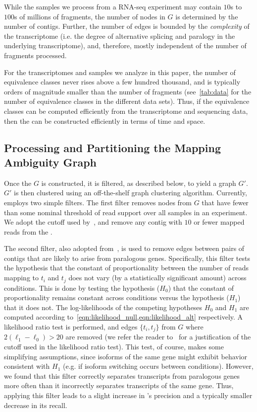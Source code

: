 While the samples we process from a \denovo RNA-seq experiment may contain $10$s to $100$s of millions of fragments, the number of nodes in $G$ is determined by the number of contigs.  Further, the number of edges is bounded by the \textit{complexity} of the transcriptome (i.e. the degree of alternative splicing and paralogy in the underlying transcriptome), and, therefore, mostly independent of the number of fragments processed. 

For the transcriptomes and samples we analyze in this paper, the number of equivalence classes never rises above a few hundred thousand, and is typically orders of magnitude smaller than the number of fragments (see~\cref{tab:data} for the number of equivalence classes in the different data sets).  Thus, if the equivalence classes can be computed efficiently from the transcriptome and sequencing data, then the \ambiggraph can be constructed efficiently in terms of time and space.

\subsection{Processing and Partitioning the Mapping Ambiguity Graph}
\label{sec:mag_filter}

Once the \ambiggraph $G$ is constructed, it is filtered, as described below, to yield a graph $G'$.  $G'$ is then clustered using an off-the-shelf graph clustering algorithm.  Currently, \rapclust employs two simple filters. The first filter removes nodes from $G$ that have fewer than some nominal threshold of read support over all samples in an experiment. We adopt the cutoff used by~\citep{corset}, and remove any contig with $10$ or fewer mapped reads from the \ambiggraph.  

The second filter, also adopted from~\citep{corset}, is used to remove edges between pairs of contigs that are likely to arise from paralogous genes.  Specifically, this filter tests the hypothesis that the constant of proportionality between the number of reads mapping to $t_i$ and $t_j$ does not vary (by a statistically significant amount) across conditions. This is done by testing the hypothesis ($H_0$) that the constant of proportionality remains constant across conditions versus the hypothesis  ($H_1$) that it does not. The log-likelihoods of the competing hypotheses $H_0$ and $H_1$ are computed according to~\cref{eqn:likelihood_null,eqn:likelihood_alt} respectively. A likelihood ratio test is performed, and edges $\{t_i, t_j\}$ from $G$ where $2 \left(\ell_1 - \ell_0\right) > 20$ are removed (we refer the reader to~\citep{corset} for a justification of the cutoff used in the likelihood ratio test).  This test, of course, makes some simplifying assumptions, since isoforms of the same gene might exhibit behavior consistent with $H_1$ (e.g. if isoform switching occurs between conditions).  However, we found that this filter correctly separates transcripts from paralogous genes more often than it incorrectly separates transcripts of the same gene.  Thus, applying this filter leads to a slight increase in \rapclust's precision and a typically smaller decrease in its recall.


